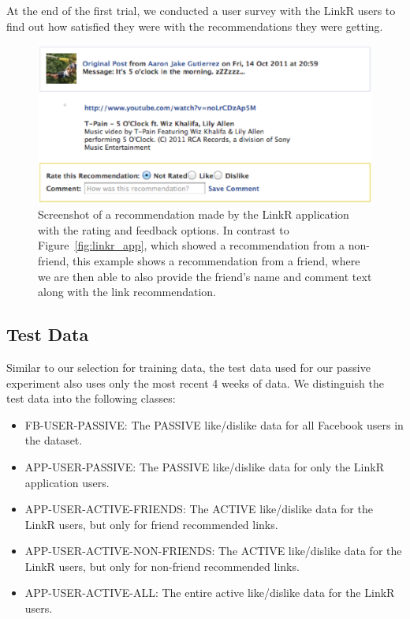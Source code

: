 At the end of the first trial, we conducted a user survey with the
LinkR users to find out how satisfied they were with the
recommendations they were getting.

\begin{figure}
\centering
\includegraphics[scale=0.7]{img/linkr_rating.eps}
\caption{Screenshot of a recommendation made by the LinkR application with the rating and feedback options.  In contrast to Figure~\ref{fig:linkr_app}, which showed a recommendation from a non-friend, this example shows a recommendation from a friend, where we are then able to also provide the friend's name and comment text along with the link recommendation.}
 \end{figure}
 
\subsection{Test Data}

Similar to our selection for training data, the test data used for our
passive experiment also uses only the most recent 4 weeks of data. We
distinguish the test data into the following classes:

\begin{itemize}
\item{FB-USER-PASSIVE: The PASSIVE like/dislike data for all Facebook users in the dataset.}
\item{APP-USER-PASSIVE: The PASSIVE like/dislike data for only the LinkR application users.}
\item{APP-USER-ACTIVE-FRIENDS: The ACTIVE like/dislike data for the LinkR users, but only for friend recommended links.}
\item{APP-USER-ACTIVE-NON-FRIENDS: The ACTIVE like/dislike data for the LinkR users, but only for non-friend recommended links.}
\item{APP-USER-ACTIVE-ALL: The entire active like/dislike data for the LinkR users.}
\end{itemize}


